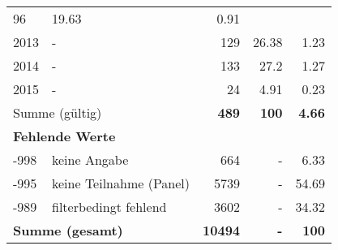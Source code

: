 \begin{longtable}{lXrrr}
       \num{96} &
       \num[round-mode=places,round-precision=2]{19,63} &
         \num[round-mode=places,round-precision=2]{0,91} \\

     2013 &
     \multicolumn{1}{X}{ -  } &


       \num{129} &
       \num[round-mode=places,round-precision=2]{26,38} &
         \num[round-mode=places,round-precision=2]{1,23} \\

     2014 &
     \multicolumn{1}{X}{ -  } &


       \num{133} &
       \num[round-mode=places,round-precision=2]{27,2} &
         \num[round-mode=places,round-precision=2]{1,27} \\

     2015 &
     \multicolumn{1}{X}{ -  } &


       \num{24} &
       \num[round-mode=places,round-precision=2]{4,91} &
         \num[round-mode=places,round-precision=2]{0,23} \\
     \midrule
     \multicolumn{2}{l}{Summe (gültig)} &
       \textbf{\num{489}} &
     \textbf{100} &
       \textbf{\num[round-mode=places,round-precision=2]{4,66}} \\
     \multicolumn{5}{l}{\textbf{Fehlende Werte}}\\
       -998 &
       keine Angabe &
         \num{664} &
        - &
         \num[round-mode=places,round-precision=2]{6,33} \\
       -995 &
       keine Teilnahme (Panel) &
         \num{5739} &
        - &
         \num[round-mode=places,round-precision=2]{54,69} \\
       -989 &
       filterbedingt fehlend &
         \num{3602} &
        - &
         \num[round-mode=places,round-precision=2]{34,32} \\
     \midrule
     \multicolumn{2}{l}{\textbf{Summe (gesamt)}} &
          \textbf{\num{10494}} &
        \textbf{-} &
        \textbf{100} \\
     \bottomrule
     \end{longtable}
     
